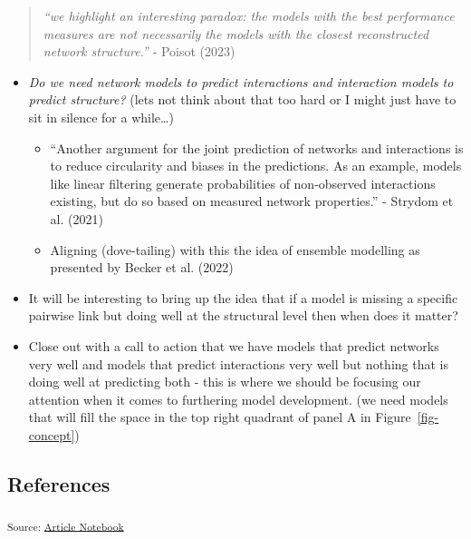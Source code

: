 \documentclass[
]{article}
\begin{document}
\begin{quote}
\emph{``we highlight an interesting paradox: the models with the best
performance measures are not necessarily the models with the closest
reconstructed network structure.''} - Poisot (2023)
\end{quote}

\begin{itemize}
\item
  \emph{Do we need network models to predict interactions and
  interaction models to predict structure?} (lets not think about that
  too hard or I might just have to sit in silence for a while\ldots)

  \begin{itemize}
  \item
    ``Another argument for the joint prediction of networks and
    interactions is to reduce circularity and biases in the predictions.
    As an example, models like linear filtering generate probabilities
    of non-observed interactions existing, but do so based on measured
    network properties.'' - Strydom et al. (2021)
  \item
    Aligning (dove-tailing) with this the idea of ensemble modelling as
    presented by Becker et al. (2022)
  \end{itemize}
\item
  It will be interesting to bring up the idea that if a model is missing
  a specific pairwise link but doing well at the structural level then
  when does it matter?
\item
  Close out with a call to action that we have models that predict
  networks very well and models that predict interactions very well but
  nothing that is doing well at predicting both - this is where we
  should be focusing our attention when it comes to furthering model
  development. (we need models that will fill the space in the top right
  quadrant of panel A in Figure~\ref{fig-concept})
\end{itemize}

\subsection*{References}\label{references}

\textsubscript{Source:
\href{https://BecksLab.github.io/ms_t_is_for_topology/index.qmd.html}{Article
Notebook}}
\end{document}
